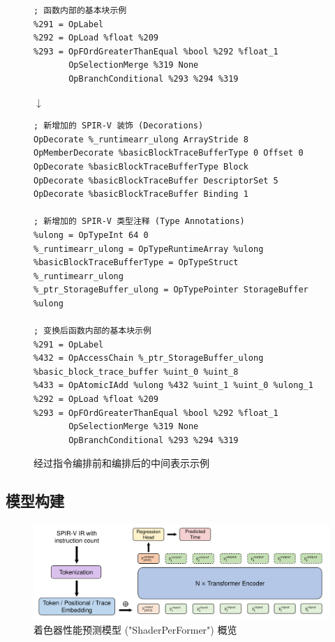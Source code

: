 \begin{figure}  %
\centering
\begin{lstlisting}[language=spirvir]
; 函数内部的基本块示例
%291 = OpLabel
%292 = OpLoad %float %209
%293 = OpFOrdGreaterThanEqual %bool %292 %float_1
       OpSelectionMerge %319 None
       OpBranchConditional %293 %294 %319
\end{lstlisting}
$ \downarrow $
\begin{lstlisting}[language=spirvir]
; 新增加的 SPIR-V 装饰 (Decorations)
OpDecorate %_runtimearr_ulong ArrayStride 8
OpMemberDecorate %basicBlockTraceBufferType 0 Offset 0
OpDecorate %basicBlockTraceBufferType Block
OpDecorate %basicBlockTraceBuffer DescriptorSet 5
OpDecorate %basicBlockTraceBuffer Binding 1

; 新增加的 SPIR-V 类型注释 (Type Annotations)
%ulong = OpTypeInt 64 0
%_runtimearr_ulong = OpTypeRuntimeArray %ulong
%basicBlockTraceBufferType = OpTypeStruct %_runtimearr_ulong
%_ptr_StorageBuffer_ulong = OpTypePointer StorageBuffer %ulong

; 变换后函数内部的基本块示例
%291 = OpLabel
%432 = OpAccessChain %_ptr_StorageBuffer_ulong %basic_block_trace_buffer %uint_0 %uint_8
%433 = OpAtomicIAdd %ulong %432 %uint_1 %uint_0 %ulong_1
%292 = OpLoad %float %209
%293 = OpFOrdGreaterThanEqual %bool %292 %float_1
       OpSelectionMerge %319 None
       OpBranchConditional %293 %294 %319
\end{lstlisting}
\caption{经过指令编排前和编排后的中间表示示例}
\label{fig:modifiedcode}
\end{figure}

\subsection{{\amend 模型构建}}
\label{sec:model_construction}

\begin{figure}[h]
  \centering
  \includegraphics[width=1\linewidth]{figures/ShaderPerFormer(1)_20240103233446.pdf}
  \caption{着色器性能预测模型 ("ShaderPerFormer") 概览}
  \label{fig:spf_overview}
\end{figure}

